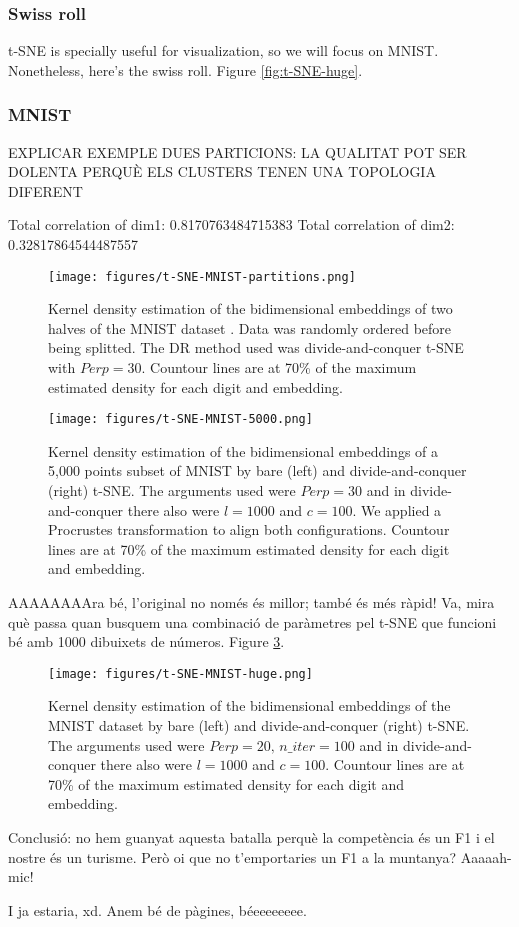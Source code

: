 \subsubsection{Swiss roll}

t-SNE is specially useful for visualization, so we will focus on MNIST. Nonetheless, here's the swiss roll. Figure \ref{fig:t-SNE-huge}.

\subsubsection{MNIST}

EXPLICAR EXEMPLE DUES PARTICIONS: LA QUALITAT POT SER DOLENTA PERQUÈ ELS CLUSTERS TENEN UNA TOPOLOGIA DIFERENT

Total correlation of dim1: 0.8170763484715383
Total correlation of dim2: 0.32817864544487557

\begin{figure}[ht]
    \centering
    \texttt{[image: figures/t-SNE-MNIST-partitions.png]}
    \caption{Kernel density estimation of the bidimensional embeddings of two halves of the MNIST dataset \citep{Cohen2017}. Data was randomly ordered before being splitted. The DR method used was divide-and-conquer t-SNE with $Perp=30$. Countour lines are at 70\% of the maximum estimated density for each digit and embedding.}
    \label{fig:t-SNE-MNIST-partitions}
\end{figure}

\begin{figure}[ht]
    \centering
    \texttt{[image: figures/t-SNE-MNIST-5000.png]}
    \caption{Kernel density estimation of the bidimensional embeddings of a 5,000 points subset of MNIST \citep{Cohen2017} by bare (left) and divide-and-conquer (right) t-SNE. The arguments used were $Perp=30$ and in divide-and-conquer there also were $l=1000$ and $c=100$. We applied a Procrustes transformation to align both configurations. Countour lines are at 70\% of the maximum estimated density for each digit and embedding.}
    \label{fig:t-SNE-MNIST}
\end{figure}

AAAAAAAAra bé, l'original no només és millor; també és més ràpid! Va, mira què passa quan busquem una combinació de paràmetres pel t-SNE que funcioni bé amb 1000 dibuixets de números. Figure \ref{fig:t-SNE-MNIST-huge}.

\begin{figure}[ht]
    \centering
    \texttt{[image: figures/t-SNE-MNIST-huge.png]}
    \caption{Kernel density estimation of the bidimensional embeddings of the MNIST dataset \citep{Cohen2017} by bare (left) and divide-and-conquer (right) t-SNE. The arguments used were $Perp=20, \, n\_iter=100$ and in divide-and-conquer there also were $l=1000$ and $c=100$. Countour lines are at 70\% of the maximum estimated density for each digit and embedding.}
    \label{fig:t-SNE-MNIST-huge}
\end{figure}


Conclusió: no hem guanyat aquesta batalla perquè la competència és un F1 i el nostre és un turisme. Però oi que no t'emportaries un F1 a la muntanya? Aaaaah-mic!

I ja estaria, xd. Anem bé de pàgines, béeeeeeeee.
